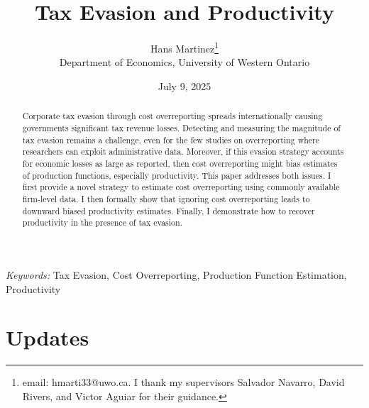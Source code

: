 \documentclass[
  12pt]{article}
\theoremstyle{definition}
\theoremstyle{remark}
\begin{document}
\def\spacingset#1{\renewcommand{\baselinestretch}%
{#1}\small\normalsize} \spacingset{1}



\date{July 9, 2025}
\title{\bf Tax Evasion and Productivity}
\author{
Hans Martinez\thanks{email: hmarti33@uwo.ca. I thank my supervisors
Salvador Navarro, David Rivers, and Victor Aguiar for their guidance.}\\
Department of Economics, University of Western Ontario\\
}
\maketitle

\bigskip
\bigskip
\begin{abstract}
Corporate tax evasion through cost overreporting spreads internationally
causing governments significant tax revenue losses. Detecting and
measuring the magnitude of tax evasion remains a challenge, even for the
few studies on overreporting where researchers can exploit
administrative data. Moreover, if this evasion strategy accounts for
economic losses as large as reported, then cost overreporting might bias
estimates of production functions, especially productivity. This paper
addresses both issues. I first provide a novel strategy to estimate cost
overreporting using commonly available firm-level data. I then formally
show that ignoring cost overreporting leads to downward biased
productivity estimates. Finally, I demonstrate how to recover
productivity in the presence of tax evasion.
\end{abstract}

\noindent%
{\it Keywords:} Tax Evasion, Cost Overreporting, Production Function
Estimation, Productivity
\vfill

\newpage
\spacingset{1.9} %

\section*{Updates}\label{updates}
\end{document}
